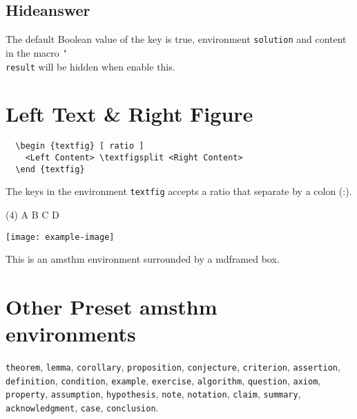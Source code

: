 \documentclass[twoside]{whatsnote}
\providecommand\env{\texttt}
\DeclareRobustCommand\cs[1]{\texttt{\char`\\#1}}
\begin{document}
\subsection{Hideanswer}

The default Boolean value of the key  is true,
environment \env{solution} and content in the macro \cs{result}
will be hidden when enable this.

\section{Left Text \& Right Figure}

\begin{verbatim}
  \begin {textfig} [ ratio ]
    <Left Content> \textfigsplit <Right Content>
  \end {textfig}
\end{verbatim}

The keys in the environment \env{textfig} accepts a ratio that separate by a colon (\cmd:).

\begin{textfig}[ 3:2 ]
  \begin{problem}
    \lipsum [ 1 ]
    \begin{tasks}(4)
      \task A
      \task B
      \task C
      \task D
    \end{tasks}
  \end{problem}
  \textfigsplit
  \centering
  \texttt{[image: example-image]}
\end{textfig}

\begin{remark}
  This is an amsthm environment surrounded by a mdframed box.
  \lipsum [ 2 ]
\end{remark}

\section{Other Preset amsthm environments}

\env{theorem}, \env{lemma}, \env{corollary}, \env{proposition}, 
\env{conjecture}, \env{criterion}, \env{assertion}, \env{definition}, 
\env{condition}, \env{example}, \env{exercise}, \env{algorithm},
\env{question}, \env{axiom}, \env{property}, \env{assumption},
\env{hypothesis}, \env{note}, \env{notation}, \env{claim}, \env{summary}, 
\env{acknowledgment}, \env{case}, \env{conclusion}.
\end{document}
